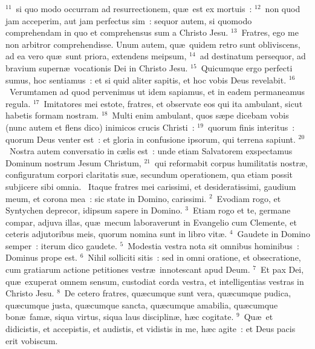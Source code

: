 ${}^{11}$~si quo modo occurram ad resurrectionem, qu\ae\ est ex mortuis~:
${}^{12}$~non quod jam acceperim, aut jam perfectus sim~: sequor autem, si quomodo comprehendam in quo et comprehensus sum a Christo Jesu.
${}^{13}$~Fratres, ego me non arbitror comprehendisse. Unum autem, qu\ae\ quidem retro sunt obliviscens, ad ea vero qu\ae\ sunt priora, extendens meipsum,
${}^{14}$~ad destinatum persequor, ad bravium supern\ae\ vocationis Dei in Christo Jesu.
${}^{15}$~Quicumque ergo perfecti sumus, hoc sentiamus~: et si quid aliter sapitis, et hoc vobis Deus revelabit.
${}^{16}$~Verumtamen ad quod pervenimus ut idem sapiamus, et in eadem permaneamus regula.
${}^{17}$~Imitatores mei estote, fratres, et observate eos qui ita ambulant, sicut habetis formam nostram.
${}^{18}$~Multi enim ambulant, quos s\ae pe dicebam vobis (nunc autem et flens dico) inimicos crucis Christi~:
${}^{19}$~quorum finis interitus~: quorum Deus venter est~: et gloria in confusione ipsorum, qui terrena sapiunt.
${}^{20}$~Nostra autem conversatio in c\ae lis est~: unde etiam Salvatorem exspectamus Dominum nostrum Jesum Christum,
${}^{21}$~qui reformabit corpus humilitatis nostr\ae , configuratum corpori claritatis su\ae , secundum operationem, qua etiam possit subjicere sibi omnia.
~Itaque fratres mei carissimi, et desideratissimi, gaudium meum, et corona mea~: sic state in Domino, carissimi.
${}^{2}$~Evodiam rogo, et Syntychen deprecor, idipsum sapere in Domino.
${}^{3}$~Etiam rogo et te, germane compar, adjuva illas, qu\ae\ mecum laboraverunt in Evangelio cum Clemente, et ceteris adjutoribus meis, quorum nomina sunt in libro vit\ae .
${}^{4}$~Gaudete in Domino semper~: iterum dico gaudete.
${}^{5}$~Modestia vestra nota sit omnibus hominibus~: Dominus prope est.
${}^{6}$~Nihil solliciti sitis~: sed in omni oratione, et obsecratione, cum gratiarum actione petitiones vestr\ae\ innotescant apud Deum.
${}^{7}$~Et pax Dei, qu\ae\ exuperat omnem sensum, custodiat corda vestra, et intelligentias vestras in Christo Jesu.
${}^{8}$~De cetero fratres, qu\ae cumque sunt vera, qu\ae cumque pudica, qu\ae cumque justa, qu\ae cumque sancta, qu\ae cumque amabilia, qu\ae cumque bon\ae\ fam\ae , siqua virtus, siqua laus disciplin\ae , h\ae c cogitate.
${}^{9}$~Qu\ae\ et didicistis, et accepistis, et audistis, et vidistis in me, h\ae c agite~: et Deus pacis erit vobiscum.



